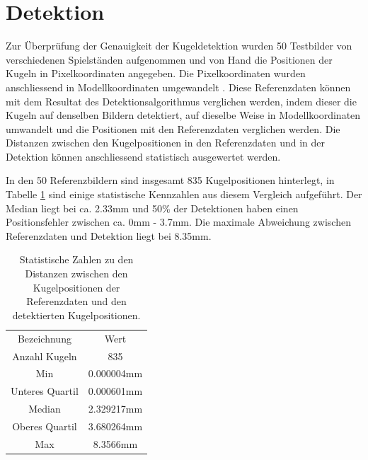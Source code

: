 \section{Detektion}
Zur Überprüfung der Genauigkeit der Kugeldetektion wurden 50 Testbilder von verschiedenen Spielständen aufgenommen
und von Hand die Positionen der Kugeln in Pixelkoordinaten angegeben.
Die Pixelkoordinaten wurden anschliessend in Modellkoordinaten umgewandelt \cite{project2:pixel_to_model_coordinates}.
Diese Referenzdaten können mit dem Resultat des Detektionsalgorithmus verglichen werden,
indem dieser die Kugeln auf denselben Bildern detektiert, auf dieselbe Weise in Modellkoordinaten umwandelt und
die Positionen mit den Referenzdaten verglichen werden.
Die Distanzen zwischen den Kugelpositionen in den Referenzdaten und in der Detektion können
anschliessend statistisch ausgewertet werden.

In den 50 Referenzbildern sind insgesamt 835 Kugelpositionen hinterlegt, in Tabelle \ref{tab:detektion_resultate_distanzen_stats}
sind einige statistische Kennzahlen aus diesem Vergleich aufgeführt. Der Median liegt bei ca. 2.33mm und 50\% der Detektionen
haben einen Positionsfehler zwischen ca. 0mm - 3.7mm. Die maximale Abweichung zwischen Referenzdaten und Detektion liegt bei 8.35mm.


\begin{table}[ht]
    \begin{tabular}{ cc }
        \rowcolor{\seccolor!50}
        Bezeichnung & Wert\\
        Anzahl Kugeln & 835\\
        Min & 0.000004mm\\
        Unteres Quartil & 0.000601mm\\
        Median & 2.329217mm\\
        Oberes Quartil & 3.680264mm\\
        Max & 8.3566mm
    \end{tabular}
    \caption{Statistische Zahlen zu den Distanzen zwischen den Kugelpositionen der Referenzdaten und den detektierten Kugelpositionen.}
    \label{tab:detektion_resultate_distanzen_stats}
\end{table}


